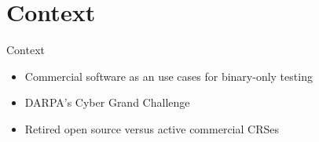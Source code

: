 \section{Context}

\begin{frame}{Context}
	\begin{itemize}
		\item Commercial software as an use cases for binary-only testing \pause
		\item DARPA's Cyber Grand Challenge \pause
		\item Retired open source versus active commercial CRSes
	\end{itemize}
\end{frame}